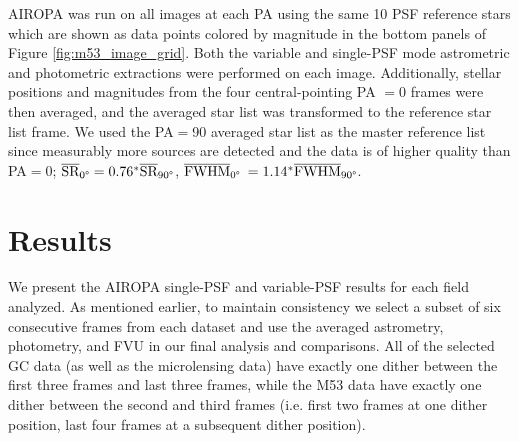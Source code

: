 \documentclass[]{spie}  %
\begin{document}
AIROPA was run on all images at each PA using the same 10 PSF reference stars which are shown as data points colored by magnitude in the bottom panels of Figure \ref{fig:m53_image_grid}. Both the variable and single-PSF mode astrometric and photometric extractions were performed on each image. Additionally, stellar positions and magnitudes from the four central-pointing PA $=0$ frames were then averaged, and the averaged star list was transformed to the reference star list frame. We used the PA$=$90 averaged star list as the master reference list since measurably more sources are detected and the data is of higher quality than PA$=$0; $\overline{\textrm{SR}}_{0\degree} = 0.76^{*}\overline{\textrm{SR}}_{90\degree}$, $\overline{\textrm{FWHM}}_{0\degree}$ $= 1.14^{*}\overline{\textrm{FWHM}}_{90\degree}$.


\section{Results} \label{sec:results}
We present the AIROPA single-PSF and variable-PSF results for each field analyzed. As mentioned earlier, to maintain consistency we select a subset of six consecutive frames from each dataset and use the averaged astrometry, photometry, and FVU in our final analysis and comparisons. All of the selected GC data (as well as the microlensing data) have exactly one dither between the first three frames and last three frames, while the M53 data have exactly one dither between the second and third frames (i.e. first two frames at one dither position, last four frames at a subsequent dither position).
\end{document}
